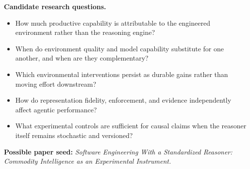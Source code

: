 \textbf{Candidate research questions.}

\begin{itemize}
\tightlist
\item
  How much productive capability is attributable to the engineered environment rather than the reasoning engine?
\item
  When do environment quality and model capability substitute for one another, and when are they complementary?
\item
  Which environmental interventions persist as durable gains rather than moving effort downstream?
\item
  How do representation fidelity, enforcement, and evidence independently affect agentic performance?
\item
  What experimental controls are sufficient for causal claims when the reasoner itself remains stochastic and versioned?
\end{itemize}

\textbf{Possible paper seed:} \emph{Software Engineering With a Standardized Reasoner: Commodity Intelligence as an Experimental Instrument.}
